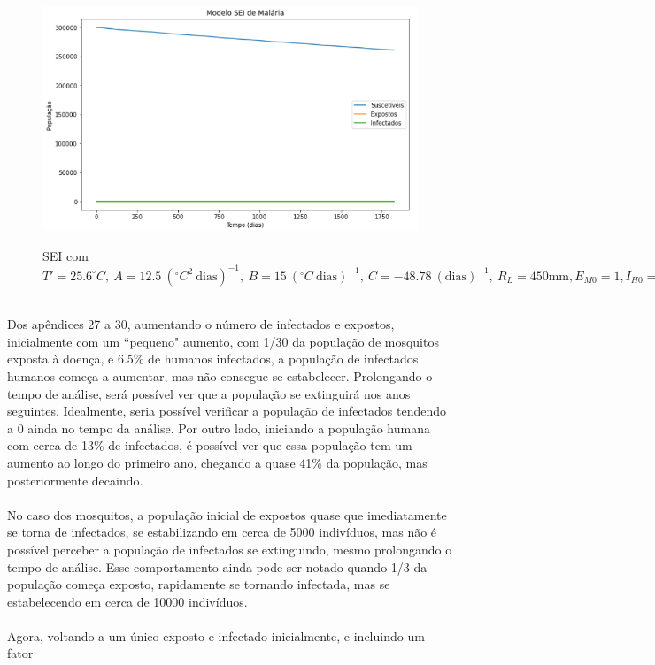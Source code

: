 \documentclass[12pt]{article}
\begin{document}
\begin{figure}[!ht]
        \centering
        \hbox{\hspace{2.5em} \includegraphics[scale=0.7] {SEI_Entrada_Pop_1_1_Infect.png}}
        \caption{SEI com $T'=25.6 ^\circ C, \ A=12.5 \ (^\circ C^2 \ \text{dias})^{-1}, \ B=15 \ (^\circ C \ \text{dias})^{-1}, \ C=-48.78 \ (\text{dias})^{-1}, \ R_L=450 \text{mm}, E_{M0}=1, I_{H0}=1$} 
\end{figure} 
\\Dos apêndices 27 a 30, aumentando o número de infectados e expostos, inicialmente com um 
``pequeno" aumento, com 1/30 da população de mosquitos exposta à doença, e 6.5\% 
de humanos infectados, a população de infectados humanos começa a aumentar, 
mas não consegue se estabelecer. Prolongando o tempo de análise, será possível 
ver que a população se extinguirá nos anos seguintes. Idealmente, seria 
possível verificar a população de infectados tendendo a 0 ainda no tempo da 
análise. Por outro lado, iniciando a população humana com cerca de 13\% de infectados, 
é possível ver que essa população tem um aumento ao longo do primeiro ano, 
chegando a quase 41\% da população, mas posteriormente decaindo.
\\\\
No caso dos mosquitos, a população inicial de expostos quase que 
imediatamente se torna de infectados, se estabilizando em cerca de 5000 
indivíduos, mas não é possível perceber a população de infectados se 
extinguindo, mesmo prolongando o tempo de análise. Esse comportamento 
ainda pode ser notado quando 1/3 da população começa exposto, rapidamente 
se tornando infectada, mas se estabelecendo em cerca de 10000 indivíduos. 
\\\\
Agora, voltando a um único exposto e infectado inicialmente, e incluindo um fator
\end{document}
